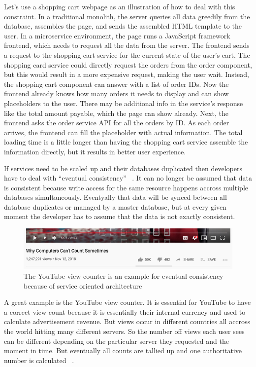 Let's use a shopping cart webpage as an illustration of how to deal with this constraint. In a traditional monolith, the server queries all data greedily from the database, assembles the page, and sends the assembled HTML template to the user. In a microservice environment, the page runs a JavaScript framework frontend, which needs to request all the data from the server. The frontend sends a request to the shopping cart service for the current state of the user's cart. The shopping card service could directly request the orders from the order component, but this would result in a more expensive request, making the user wait. Instead, the shopping cart component can answer with a list of order IDs. Now the frontend already knows how many orders it needs to display and can show placeholders to the user. There may be additional info in the service's response like the total amount payable, which the page can show already. Next, the frontend asks the order service API for all the orders by ID. As each order arrives, the frontend can fill the placeholder with actual information. The total loading time is a little longer than having the shopping cart service assemble the information directly, but it results in better user experience.

If services need to be scaled up and their databases duplicated then developers have to deal with ``eventual consistency'' ~\cite{fowler.2015}. It can no longer be assumed that data is consistent because write access for the same resource happens accross multiple databases simultaneously. Eventyally that data will be synced between all database duplicates or managed by a master database, but at every given moment the developer has to assume that the data is not exactly consistent.

\begin{figure}[ht]
  \centering
  \includegraphics[width=0.70\linewidth]{assets/youtube-view-counter.png}
  \caption{The YouTube view counter is an example for eventual consistency because of service oriented architecture}
\end{figure}

A great example is the YouTube view counter. It is essential for YouTube to have a correct view count because it is essentially their internal currency and used to calculate advertisement revenue. But views occur in different countries all accross the world hitting many different servers. So the number off views each user sees can be different depending on the particular server they requested and the moment in time. But eventually all counts are tallied up and one authoritative number is calculated
~\cite{scott.2018}.


